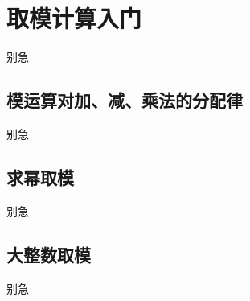 
\section{取模计算入门}
\begin{frame}{别急}\end{frame} %
\subsection{模运算对加、减、乘法的分配律}
\begin{frame}[c]
  \progressnow*
\end{frame}
\begin{frame}{别急}\end{frame} %
\subsection{求幂取模}
\begin{frame}[c]
  \progressnow*
\end{frame}
\begin{frame}{别急}\end{frame} %
\subsection{大整数取模}
\begin{frame}[c]
  \progressnow*
\end{frame}
\begin{frame}{别急}\end{frame} %
